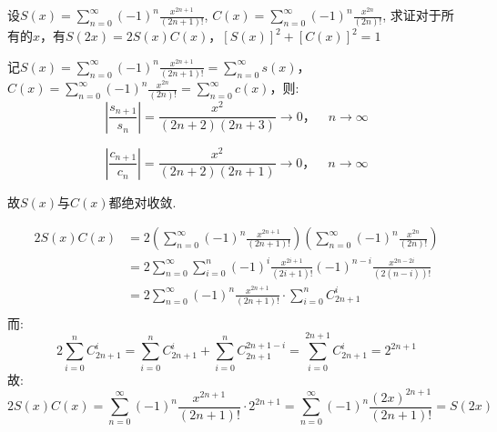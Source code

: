 \begin{problem}
    设\(S(x) = \sum_{n=0}^{\infty} (-1)^n \frac{x^{2n+1}}{(2n+1)!}\),
    \(C(x) = \sum_{n=0}^{\infty} (-1)^n \frac{x^{2n}}{(2n)!}\),
    求证对于所有的\(x\)，有\(S(2x)=2S(x)C(x)\)，\([S(x)]^2+[C(x)]^2=1\)
\end{problem}


\begin{solution}
    记\(S(x) = \sum_{n=0}^{\infty} (-1)^n \frac{x^{2n+1}}{(2n+1)!} =
    \sum_{n=0}^{\infty} s(x)\)，\(C(x) = \sum_{n=0}^{\infty} (-1)^n
    \frac{x^{2n}}{(2n)!} = \sum_{n=0}^{\infty} c(x)\)，则:
    \[
        \left\vert \frac{s_{n+1}}{s_{n}} \right\vert =
        \frac{x^2}{(2n+2)(2n+3)} \to 0，\quad n \to \infty
    \]

    \[
        \left\vert \frac{c_{n+1}}{c_{n}} \right\vert =
        \frac{x^2}{(2n+2)(2n+1)} \to 0，\quad n \to \infty
    \]

    故\(S(x)\)与\(C(x)\)都绝对收敛.

    \begin{align*}
        2S(x)C(x) & = 2\left( \sum_{n=0}^{\infty} (-1)^n
        \frac{x^{2n+1}}{(2n+1)!} \right)  \left(
            \sum_{n=0}^{\infty} (-1)^n
        \frac{x^{2n}}{(2n)!} \right)
        \\
        & = 2 \sum_{n=0}^{\infty} \sum_{i=0}^{n} (-1)^{i}
        \frac{x^{2i+1}}{(2i+1)!} (-1)^{n-i}
        \frac{x^{2n-2i}}{(2(n-i))!}           \\
        & = 2 \sum_{n=0}^{\infty} (-1)^n
        \frac{x^{2n+1}}{(2n+1)!} \cdot
        \sum_{i=0}^{n} C^{i}_{2n+1}
        \\
    \end{align*}
    而:
    \[
        2 \sum_{i=0}^{n} C^{i}_{2n+1} = \sum_{i=0}^{n} C^{i}_{2n+1} +
        \sum_{i=0}^{n} C^{2n+1-i}_{2n+1}  = \sum_{i=0}^{2n+1}
        C^{i}_{2n+1} = 2^{2n+1}
    \]
    故:
    \[
        2S(x)C(x) = \sum_{n=0}^{\infty} (-1)^n
        \frac{x^{2n+1}}{(2n+1)!}
        \cdot 2^{2n+1} = \sum_{n=0}^{\infty} (-1)^n
        \frac{(2x)^{2n+1}}{(2n+1)!} = S(2x)
    \]


\end{solution}
